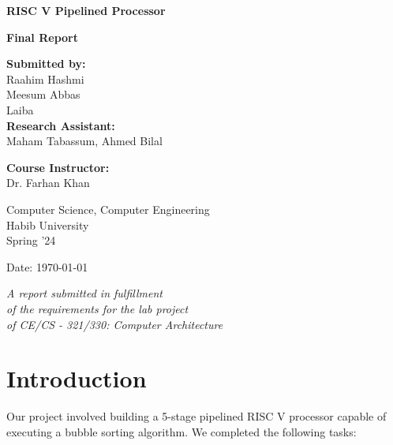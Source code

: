 \documentclass[12pt]{article}
\begin{document}
\begin{titlepage}
    \begin{center}
        \vspace{1cm}

        \LARGE
        \textbf{RISC V Pipelined Processor}

        \vspace{1.5cm}
        \Large
        \textbf{Final Report}

        \vspace{2cm}
        \large
        \textbf{Submitted by:}\\
        Raahim Hashmi \\
        Meesum Abbas \\
        Laiba \\

        \vspace{0.5cm}
        \large
        \textbf{Research Assistant:}\\
        Maham Tabassum, Ahmed Bilal

        \vspace{0.5cm}
        \large
       \textbf{ Course Instructor:}\\
       Dr. Farhan Khan

        \vspace{1cm}
        \large
        Computer Science, Computer Engineering\\ Habib University\\
        Spring '24

        \vspace{1cm}
        \large
        Date: \today 

        \vfill
        \small
        \textit{A report submitted in fulfillment\\
        of the requirements for the lab project\\ of 
        CE/CS - 321/330: Computer Architecture}

    \end{center}
\end{titlepage}
\tableofcontents

\newpage



\section{Introduction}\label{sec:intro}
Our project involved building a 5-stage pipelined RISC V processor capable of executing a bubble sorting algorithm. We completed the following tasks:
\end{document}
